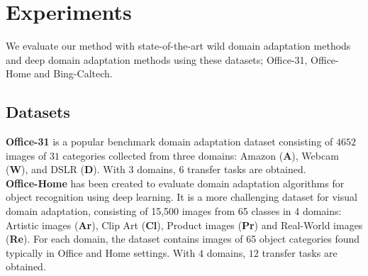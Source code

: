 \section{Experiments}
We evaluate our method with state-of-the-art wild domain adaptation methods and deep domain adaptation methods using these datasets; Office-31, Office-Home and Bing-Caltech.
\subsection{Datasets}
\label{sec:datasets}
\textbf{Office-31} \cite{office31} is a popular benchmark domain adaptation dataset consisting of $4652$ images of $31$ categories collected from three domains: Amazon (\textbf{A}), Webcam (\textbf{W}), and DSLR (\textbf{D}). With $3$ domains, $6$ transfer tasks are obtained.\\
\textbf{Office-Home} \cite{officehome} has been created to evaluate domain adaptation algorithms for object recognition using deep learning. It is a more challenging
dataset for visual domain adaptation, consisting of 15,500 images from 65 classes in 4 domains: Artistic images (\textbf{Ar}), Clip Art (\textbf{Cl}), Product images (\textbf{Pr}) and Real-World images (\textbf{Re}). For each domain, the dataset contains images of 65 object categories found typically in Office and Home settings. With $4$ domains, $12$ transfer tasks are obtained.\\

